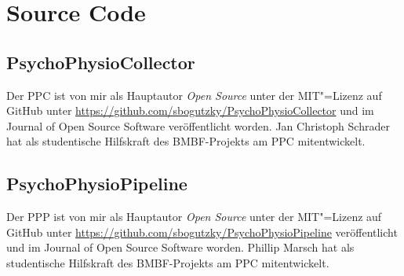 

\chapter{Source Code} 
\section{PsychoPhysioCollector} Der \ac{PPC} ist von mir als Hauptautor \emph{Open Source} unter der MIT"=Lizenz auf GitHub unter \url{https://github.com/sbogutzky/PsychoPhysioCollector} und im Journal of Open Source Software \citep{Bogutzky2016} veröffentlicht worden. Jan Christoph Schrader hat als studentische Hilfskraft des \acs{BMBF}-Projekts am \ac{PPC} mitentwickelt. 

\section{PsychoPhysioPipeline} Der \ac{PPP} ist von mir als Hauptautor \emph{Open Source} unter der MIT"=Lizenz auf GitHub unter \url{https://github.com/sbogutzky/PsychoPhysioPipeline} veröffentlicht und im Journal of Open Source Software \citep{Bogutzky2016a} worden. Phillip Marsch hat als studentische Hilfskraft des \acs{BMBF}-Projekts am \ac{PPC} mitentwickelt. 
